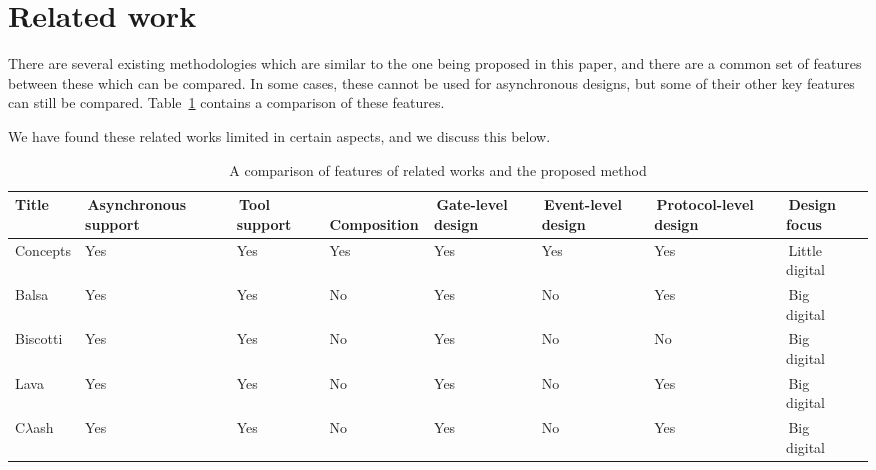 \documentclass[british,compsoc]{IEEEtran}
\begin{document}

\section{Related work\label{sec:related-work}}

There are several existing methodologies which are similar to the
one being proposed in this paper, and there are a common set of features between these which can be compared.
In some cases, these cannot be used for asynchronous designs, but some of their other key features can still be compared.
Table~\ref{tab:related_work} contains a comparison of these features.

We have found these related works limited in
certain aspects, and we discuss this below.
\begin{table}[t]
\caption{A comparison of features of related works and the proposed method \label{tab:related_work}}
  \centering
  \begin{tabular}[htb]{| m{1.5cm} | m{2cm} | m{1.3cm} | m{1.75cm} | m{1.5cm} | m{1.5cm} | m{1.7cm} | m{1.15cm} |}
  \hline
  Title                       & \,Asynchronous support & \,Tool support  & \,Composition & \,Gate-level design & \,Event-level design & \,Protocol-level design  & \,Design focus \\ \hline \hline
  Concepts              & Yes                               & Yes                 & Yes               & Yes                       & Yes                         & Yes                              & \,Little digital \\ \hline
  Balsa                     & Yes                               & Yes                 & No                & Yes                       & No                          & Yes                              & \,Big\,\,\,\, digital \\ \hline
  Biscotti                  & Yes                               & Yes                 & No                & Yes                       & No                           & No                               & \,Big\,\,\,\, digital \\ \hline
  Lava                      & Yes                               & Yes                 & No                & Yes                       & No                           & Yes                             & \,Big\,\,\,\, digital \\ \hline
  C$\lambda$ash     & Yes                               & Yes                 & No                & Yes                       & No                           & Yes                             & \,Big\,\,\,\, digital \\ \hline

\end{tabular}
\end{table}
\end{document}
